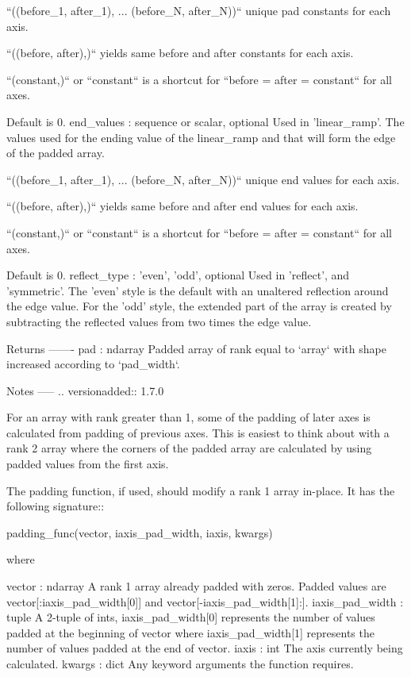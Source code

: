 \begin{DoxyVerb}
    ``((before_1, after_1), ... (before_N, after_N))`` unique pad constants
    for each axis.

    ``((before, after),)`` yields same before and after constants for each
    axis.

    ``(constant,)`` or ``constant`` is a shortcut for ``before = after = constant`` for
    all axes.

    Default is 0.
end_values : sequence or scalar, optional
    Used in 'linear_ramp'.  The values used for the ending value of the
    linear_ramp and that will form the edge of the padded array.

    ``((before_1, after_1), ... (before_N, after_N))`` unique end values
    for each axis.

    ``((before, after),)`` yields same before and after end values for each
    axis.

    ``(constant,)`` or ``constant`` is a shortcut for ``before = after = constant`` for
    all axes.

    Default is 0.
reflect_type : {'even', 'odd'}, optional
    Used in 'reflect', and 'symmetric'.  The 'even' style is the
    default with an unaltered reflection around the edge value.  For
    the 'odd' style, the extended part of the array is created by
    subtracting the reflected values from two times the edge value.

Returns
-------
pad : ndarray
    Padded array of rank equal to `array` with shape increased
    according to `pad_width`.

Notes
-----
.. versionadded:: 1.7.0

For an array with rank greater than 1, some of the padding of later
axes is calculated from padding of previous axes.  This is easiest to
think about with a rank 2 array where the corners of the padded array
are calculated by using padded values from the first axis.

The padding function, if used, should modify a rank 1 array in-place. It
has the following signature::

    padding_func(vector, iaxis_pad_width, iaxis, kwargs)

where

    vector : ndarray
        A rank 1 array already padded with zeros.  Padded values are
        vector[:iaxis_pad_width[0]] and vector[-iaxis_pad_width[1]:].
    iaxis_pad_width : tuple
        A 2-tuple of ints, iaxis_pad_width[0] represents the number of
        values padded at the beginning of vector where
        iaxis_pad_width[1] represents the number of values padded at
        the end of vector.
    iaxis : int
        The axis currently being calculated.
    kwargs : dict
        Any keyword arguments the function requires.


\end{DoxyVerb}
